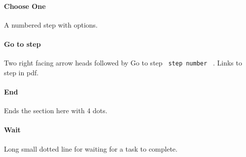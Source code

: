 \paragraph{Choose One}\label{choose-one}

A numbered step with options.

\begin{Shaded}
\begin{Highlighting}[]
\NormalTok{ \#choose{-}one[}
\NormalTok{  ]}
\end{Highlighting}
\end{Shaded}

\paragraph{Go to step}\label{go-to-step}

Two right facing arrow heads followed by Go to step
\texttt{\ step\ number\ } . Links to step in pdf.

\begin{Shaded}
\begin{Highlighting}[]
\end{Highlighting}
\end{Shaded}

\paragraph{End}\label{end}

Ends the section here with 4 dots.

\begin{Shaded}
\begin{Highlighting}[]
\end{Highlighting}
\end{Shaded}

\paragraph{Wait}\label{wait}

Long small dotted line for waiting for a task to complete.

\begin{Shaded}
\begin{Highlighting}[]
\end{Highlighting}
\end{Shaded}

